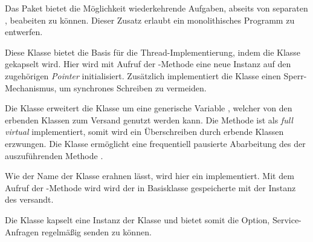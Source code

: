 
Das Paket  bietet die Möglichkeit wiederkehrende Aufgaben, abseits von separaten \Node[s], beabeiten zu können. Dieser Zusatz erlaubt ein monolithisches Programm zu entwerfen.


Diese Klasse bietet die Basis für die Thread-Implementierung, indem die Klasse  gekapselt wird. Hier wird mit Aufruf der -Methode eine neue Instanz auf den zugehörigen \textit{Pointer} initialisiert. Zusätzlich implementiert die Klasse  einen Sperr-Mechanismus, um synchrones Schreiben zu vermeiden. 


Die Klasse  erweitert die Klasse  um eine generische Variable , welcher von den erbenden Klassen zum Versand genutzt werden kann. Die Methode  ist als \textit{full virtual} implementiert, somit wird ein Überschreiben durch erbende Klassen erzwungen. Die Klasse  ermöglicht eine frequentiell pausierte Abarbeitung des der auszuführenden Methode .



Wie der Name der Klasse  erahnen lässt, wird hier ein  implementiert. Mit dem Aufruf der -Methode wird wird der in Basisklasse  gespeicherte  mit der Instanz des  versandt.


Die Klasse  kapselt eine Instanz der Klasse  und bietet somit die Option, Service-Anfragen regelmäßig senden zu können.